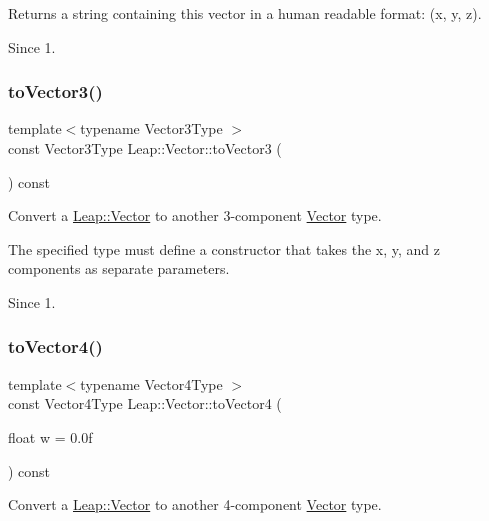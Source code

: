 Returns a string containing this vector in a human readable format\+: (x, y, z). \begin{DoxySince}{Since}
1. 
\end{DoxySince}
\mbox{\label{struct_leap_1_1_vector_abb86de3a3467f83a51ce79170eae66ed}} 
\subsubsection{\texorpdfstring{to\+Vector3()}{toVector3()}}
{\footnotesize\ttfamily template$<$typename Vector3\+Type $>$ \\
const Vector3\+Type Leap\+::\+Vector\+::to\+Vector3 (\begin{DoxyParamCaption}{ }\end{DoxyParamCaption}) const\hspace{0.3cm}{\ttfamily [inline]}}

Convert a \hyperlink{struct_leap_1_1_vector}{Leap\+::\+Vector} to another 3-\/component \hyperlink{struct_leap_1_1_vector}{Vector} type.

The specified type must define a constructor that takes the x, y, and z components as separate parameters. \begin{DoxySince}{Since}
1. 
\end{DoxySince}
\mbox{\label{struct_leap_1_1_vector_aad4866e49b58bcdf52398459f27d0e81}} 
\subsubsection{\texorpdfstring{to\+Vector4()}{toVector4()}}
{\footnotesize\ttfamily template$<$typename Vector4\+Type $>$ \\
const Vector4\+Type Leap\+::\+Vector\+::to\+Vector4 (\begin{DoxyParamCaption}\item[{float}]{w = {\ttfamily 0.0f} }\end{DoxyParamCaption}) const\hspace{0.3cm}{\ttfamily [inline]}}

Convert a \hyperlink{struct_leap_1_1_vector}{Leap\+::\+Vector} to another 4-\/component \hyperlink{struct_leap_1_1_vector}{Vector} type.

